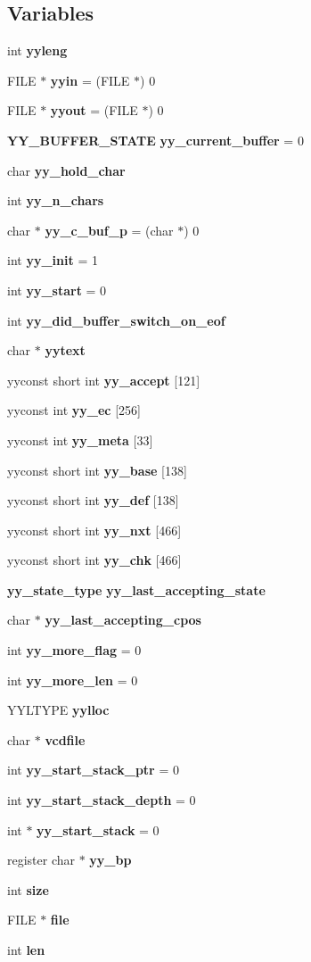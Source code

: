 \subsection*{Variables}
\begin{CompactItemize}
\item 
int {\bf yyleng}
\item 
FILE $\ast$ {\bf yyin} = (FILE $\ast$) 0
\item 
FILE $\ast$ {\bf yyout} = (FILE $\ast$) 0
\item 
{\bf YY\_\-BUFFER\_\-STATE} {\bf yy\_\-current\_\-buffer} = 0
\item 
char {\bf yy\_\-hold\_\-char}
\item 
int {\bf yy\_\-n\_\-chars}
\item 
char $\ast$ {\bf yy\_\-c\_\-buf\_\-p} = (char $\ast$) 0
\item 
int {\bf yy\_\-init} = 1
\item 
int {\bf yy\_\-start} = 0
\item 
int {\bf yy\_\-did\_\-buffer\_\-switch\_\-on\_\-eof}
\item 
char $\ast$ {\bf yytext}
\item 
yyconst short int {\bf yy\_\-accept} [121]
\item 
yyconst int {\bf yy\_\-ec} [256]
\item 
yyconst int {\bf yy\_\-meta} [33]
\item 
yyconst short int {\bf yy\_\-base} [138]
\item 
yyconst short int {\bf yy\_\-def} [138]
\item 
yyconst short int {\bf yy\_\-nxt} [466]
\item 
yyconst short int {\bf yy\_\-chk} [466]
\item 
{\bf yy\_\-state\_\-type} {\bf yy\_\-last\_\-accepting\_\-state}
\item 
char $\ast$ {\bf yy\_\-last\_\-accepting\_\-cpos}
\item 
int {\bf yy\_\-more\_\-flag} = 0
\item 
int {\bf yy\_\-more\_\-len} = 0
\item 
YYLTYPE {\bf yylloc}
\item 
char $\ast$ {\bf vcdfile}
\item 
int {\bf yy\_\-start\_\-stack\_\-ptr} = 0
\item 
int {\bf yy\_\-start\_\-stack\_\-depth} = 0
\item 
int $\ast$ {\bf yy\_\-start\_\-stack} = 0
\item 
register char $\ast$ {\bf yy\_\-bp}
\item 
int {\bf size}
\item 
FILE $\ast$ {\bf file}
\item 
int {\bf len}
\end{CompactItemize}



